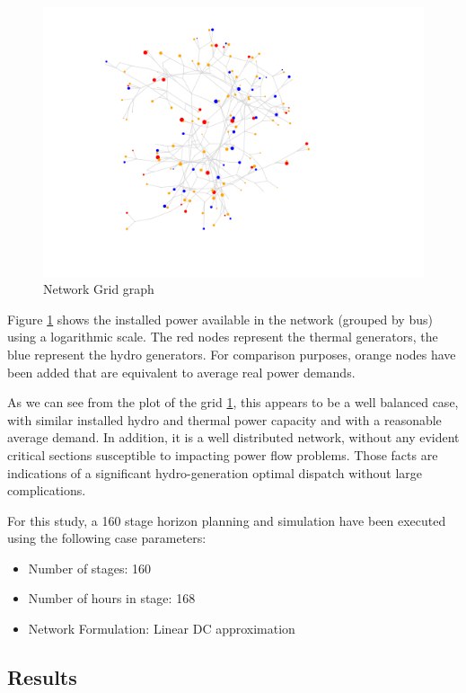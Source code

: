 \documentclass{juliacon}
\begin{document}
\begin{figure}[htb]
\centerline{\includegraphics[width=1.4\linewidth]{fig/graph_grid.png}}
\caption{Network Grid graph}
\label{fig:graph_grid}
\end{figure}

Figure \ref{fig:graph_grid} shows the installed power available in the network (grouped by bus) using a logarithmic scale. The red nodes represent the thermal generators, the blue represent the hydro generators. For comparison purposes, orange nodes have been added that are equivalent to average real power demands.

As we can see from the plot of the grid \ref{fig:graph_grid}, this appears to be a well balanced case, with similar installed hydro and thermal power capacity and with a reasonable average demand. In addition, it is a well distributed network, without any evident critical sections susceptible to impacting power flow problems. Those facts are indications of a significant hydro-generation optimal dispatch without large complications.

For this study, a 160 stage horizon planning and simulation have been executed using the following case parameters:

\begin{itemize}
    \item Number of stages: 160
    \item Number of hours in stage: 168 
    \item Network Formulation: Linear DC approximation
\end{itemize}

\subsection{Results} %
\end{document}
